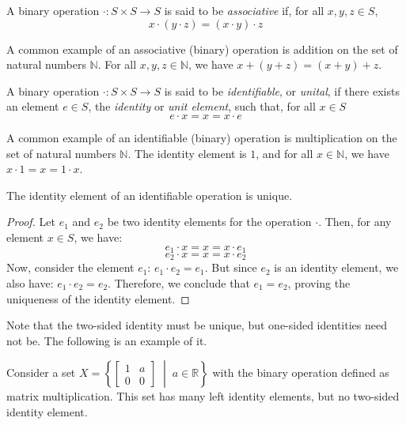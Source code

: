 \documentclass[
	11pt, %
	fleqn, %
	a4paper, %
]{LegrandOrangeBook}
\newcommand{\R}{\mathbb{R}} %
\begin{document}
\begin{definition}[Associative]
    A binary operation $\cdot: S \times S \to S$ is said to be \emph{associative} if, for all $x,y,z \in S$, 
    \[ x \cdot (y \cdot z) = (x \cdot y) \cdot z \]
\end{definition}

\begin{example}
    A common example of an associative (binary) operation is addition on the set of natural numbers $\mathbb{N}$. For all $x,y,z \in \mathbb{N}$, we have $x + (y + z) = (x + y) + z$.
\end{example}

\begin{definition}[Identifiable]
    A binary operation $\cdot: S \times S \to S$ is said to be \emph{identifiable}, or \emph{unital}, if there exists an element $e \in S$, the \emph{identity} or \emph{unit element}, such that, for all $x \in S$
    \[ e \cdot x = x = x \cdot e \]
\end{definition}

\begin{example}
    A common example of an identifiable (binary) operation is multiplication on the set of natural numbers $\mathbb{N}$. The identity element is $1$, and for all $x \in \mathbb{N}$, we have $x \cdot 1 = x = 1 \cdot x$.
\end{example}

\begin{proposition}
    The identity element of an identifiable operation is unique.
\end{proposition}

\begin{proof}
    Let $e_1$ and $e_2$ be two identity elements for the operation $\cdot$. Then, for any element $x \in S$, we have:
    \[ e_1 \cdot x = x = x \cdot e_1 \]
    \[ e_2 \cdot x = x = x \cdot e_2 \]
    Now, consider the element $e_1$: $e_1 \cdot e_2 = e_1$.
    But since $e_2$ is an identity element, we also have: $e_1 \cdot e_2 = e_2$.
    Therefore, we conclude that $e_1 = e_2$, proving the uniqueness of the identity element.
\end{proof}

Note that the two-sided identity must be unique, but one-sided identities need not be. The following is an example of it.

\begin{example}
    Consider a set $X = \left\{ \begin{bmatrix}
        1 & a \\
        0 & 0 
    \end{bmatrix} \; \middle| \; a \in \R \right\}$ with the binary operation defined as matrix multiplication. This set has many left identity elements, but no two-sided identity element.
\end{example}
\end{document}
